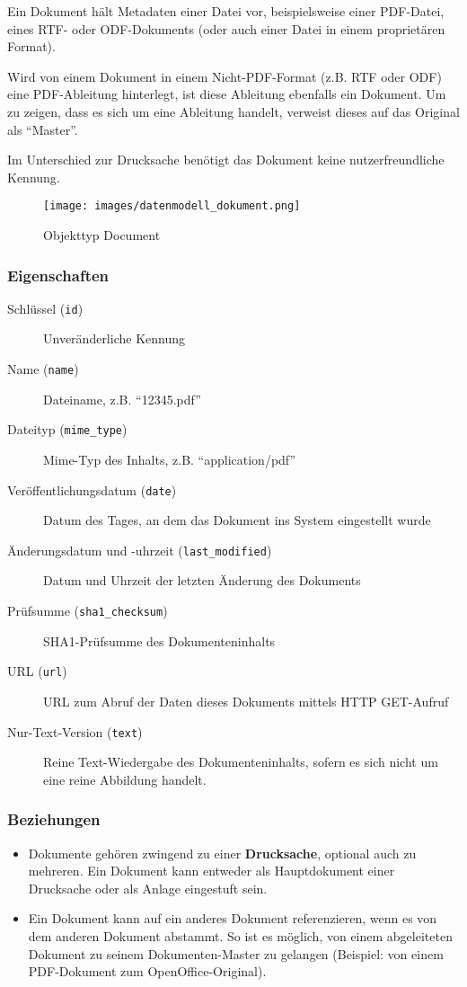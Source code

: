 \documentclass[,a4paper]{article}
\makeatletter
\def\maxwidth{\ifdim\Gin@nat@width>\linewidth\linewidth
\else\Gin@nat@width\fi}
\let\Oldincludegraphics\includegraphics
\renewcommand{\includegraphics}[1]{\Oldincludegraphics[width=\maxwidth]{#1}}
\makeatother
\begin{document}
Ein Dokument hält Metadaten einer Datei vor, beispielsweise einer
PDF-Datei, eines RTF- oder ODF-Dokuments (oder auch einer Datei in einem
proprietären Format).

Wird von einem Dokument in einem Nicht-PDF-Format (z.B. RTF oder ODF)
eine PDF-Ableitung hinterlegt, ist diese Ableitung ebenfalls ein
Dokument. Um zu zeigen, dass es sich um eine Ableitung handelt, verweist
dieses auf das Original als ``Master''.

Im Unterschied zur Drucksache benötigt das Dokument keine
nutzerfreundliche Kennung.

\begin{figure}[htbp]
\centering
\texttt{[image: images/datenmodell\_dokument.png]}
\caption{Objekttyp Document}
\end{figure}

\subsubsection{Eigenschaften}

\begin{description}
\item[Schlüssel (\texttt{id})]
Unveränderliche Kennung
\item[Name (\texttt{name})]
Dateiname, z.B. ``12345.pdf''
\item[Dateityp (\texttt{mime\_type})]
Mime-Typ des Inhalts, z.B. ``application/pdf''
\item[Veröffentlichungsdatum (\texttt{date})]
Datum des Tages, an dem das Dokument ins System eingestellt wurde
\item[Änderungsdatum und -uhrzeit (\texttt{last\_modified})]
Datum und Uhrzeit der letzten Änderung des Dokuments
\item[Prüfsumme (\texttt{sha1\_checksum})]
SHA1-Prüfsumme des Dokumenteninhalts
\item[URL (\texttt{url})]
URL zum Abruf der Daten dieses Dokuments mittels HTTP GET-Aufruf
\item[Nur-Text-Version (\texttt{text})]
Reine Text-Wiedergabe des Dokumenteninhalts, sofern es sich nicht um
eine reine Abbildung handelt.
\end{description}

\subsubsection{Beziehungen}

\begin{itemize}
\item
  Dokumente gehören zwingend zu einer \textbf{Drucksache}, optional auch
  zu mehreren. Ein Dokument kann entweder als Hauptdokument einer
  Drucksache oder als Anlage eingestuft sein.
\item
  Ein Dokument kann auf ein anderes Dokument referenzieren, wenn es von
  dem anderen Dokument abstammt. So ist es möglich, von einem
  abgeleiteten Dokument zu seinem Dokumenten-Master zu gelangen
  (Beispiel: von einem PDF-Dokument zum OpenOffice-Original).
\end{itemize}
\end{document}
